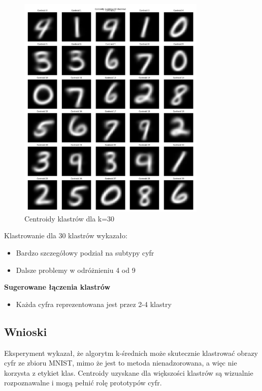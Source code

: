 \documentclass[12pt,a4paper]{article}
\begin{document}
\begin{figure}[H]
\centering
\includegraphics[width=0.8\textwidth]{img/centroidy30.png}
\caption{Centroidy klastrów dla k=30}
\end{figure}


Klastrowanie dla 30 klastrów wykazało:
\begin{itemize}
    \item Bardzo szczegółowy podział na subtypy cyfr
    \item Dalsze problemy w odróżnieniu 4 od 9
\end{itemize}

\noindent \textbf{Sugerowane łączenia klastrów}
\begin{itemize}
    \item Każda cyfra reprezentowana jest przez 2-4 klastry
\end{itemize}

\subsection{Wnioski}

Eksperyment wykazał, że algorytm k-średnich może skutecznie klastrować obrazy cyfr ze zbioru MNIST, mimo że jest to metoda nienadzorowana, a więc nie korzysta z etykiet klas. Centroidy uzyskane dla większości klastrów są wizualnie rozpoznawalne i mogą pełnić rolę prototypów cyfr. \\
\end{document}
